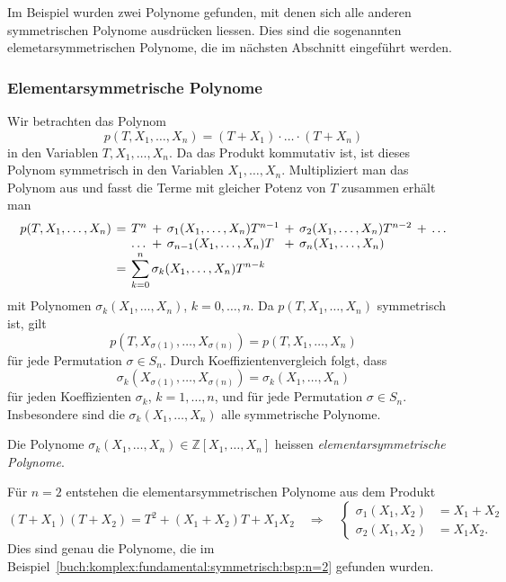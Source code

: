 Im Beispiel wurden zwei Polynome gefunden, mit denen sich alle 
anderen symmetrischen Polynome ausdrücken liessen.
Dies sind die sogenannten elemetarsymmetrischen Polynome,
die im nächsten Abschnitt eingeführt werden.

%
%
\subsubsection{Elementarsymmetrische Polynome}
Wir betrachten das Polynom
\[
p(T,X_1,\dots,X_n)
=
(T+X_1)\cdot\ldots\cdot (T+X_n)
\]
in den Variablen $T,X_1,\dots,X_n$.
Da das Produkt kommutativ ist, ist dieses Polynom symmetrisch in den
Variablen $X_1,\dots,X_n$.
Multipliziert man das Polynom aus und fasst die Terme mit gleicher
Potenz von $T$ zusammen erhält man
\[
\renewcommand{\arraycolsep}{2pt}
\begin{array}{rclclclcl}
p(T,X_1,\dots,X_n)
&=&
T^n
&+&
\sigma_1(X_1,\dots,X_n)
T^{n-1}
&+&
\sigma_2(X_1,\dots,X_n)
T^{n-2}
&+&
\ldots
\\
& &
\ldots
&+&
\sigma_{n-1}(X_1,\dots,X_n) T
&+&
\sigma_n(X_1,\dots,X_n)
\\
&=&
\rlap{$\displaystyle \sum_{k=0}^n \sigma_k(X_1,\dots,X_n) T^{n-k} $}
\end{array}
\]
mit Polynomen $\sigma_k(X_1,\dots,X_n)$, $k=0,\dots,n$.
Da $p(T,X_1,\dots,X_n)$ symmetrisch ist, gilt
\[
p(T,X_{\sigma(1)},\dots,X_{\sigma(n)})
=
p(T,X_1,\dots,X_n)
\] 
für jede Permutation $\sigma\in S_n$.
Durch Koeffizientenvergleich folgt, dass
\[
\sigma_k(X_{\sigma(1)},\dots,X_{\sigma(n)})
=
\sigma_k(X_1,\dots,X_n)
\]
für jeden Koeffizienten $\sigma_k$, $k=1,\dots,n$, und für jede
Permutation $\sigma\in S_n$.
Insbesondere sind die $\sigma_k(X_1,\dots,X_n)$ alle symmetrische
Polynome.

\begin{definition}
\label{buch:komplex:fundamental:def:elementarsymmetrisch}
Die Polynome $\sigma_k(X_1,\dots,X_n)\in \mathbb{Z}[X_1,\dots,X_n]$ 
heissen \emph{elementarsymmetrische Polynome}.
%
\end{definition}

\begin{beispiel}
Für $n=2$ entstehen die elementarsymmetrischen Polynome aus dem
Produkt
\[
(T+X_1)(T+X_2)
=
T^2 +(X_1+X_2)T+X_1X_2
\quad\Rightarrow\quad
\left\{
\begin{aligned}
\sigma_1(X_1,X_2) &= X_1+X_2 \\
\sigma_2(X_1,X_2) &= X_1X_2.
\end{aligned}
\right.
\]
Dies sind genau die Polynome, die im
Beispiel~\ref{buch:komplex:fundamental:symmetrisch:bsp:n=2}
gefunden wurden.
\end{beispiel}

